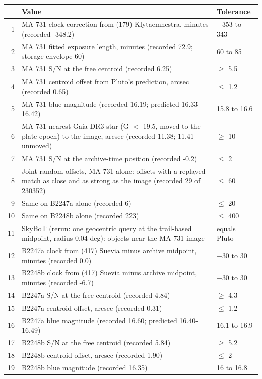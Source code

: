 \documentclass[11pt]{article}
\begin{document}
\begin{appendices}
\begin{table}[p]
\centering
\scriptsize
\begin{tabular}{@{}rp{}l@{}}
\toprule
 & Value & Tolerance \\
\midrule
1 & MA 731 clock correction from (179) Klytaemnestra, minutes (recorded -348.2) & $-$353 to $-$343 \\
2 & MA 731 fitted exposure length, minutes (recorded 72.9; storage envelope 60) & 60 to 85 \\
3 & MA 731 S/N at the free centroid (recorded 6.25) & $\ge$ 5.5 \\
4 & MA 731 centroid offset from Pluto's prediction, arcsec (recorded 0.65) & $\le$ 1.2 \\
5 & MA 731 blue magnitude (recorded 16.19; predicted 16.33-16.42) & 15.8 to 16.6 \\
6 & MA 731 nearest Gaia DR3 star (G $<$ 19.5, moved to the plate epoch) to the image, arcsec (recorded 11.38; 11.41 unmoved) & $\ge$ 10 \\
7 & MA 731 S/N at the archive-time position (recorded -0.2) & $\le$ 2 \\
8 & Joint random offsets, MA 731 alone: offsets with a replayed match as close and as strong as the image (recorded 29 of 230352) & $\le$ 60 \\
9 & Same on B2247a alone (recorded 6) & $\le$ 20 \\
10 & Same on B2248b alone (recorded 223) & $\le$ 400 \\
11 & SkyBoT (rerun: one geocentric query at the trail-based midpoint, radius 0.04 deg): objects near the MA 731 image & equals Pluto \\
12 & B2247a clock from (417) Suevia minus archive midpoint, minutes (recorded 0.0) & $-$30 to 30 \\
13 & B2248b clock from (417) Suevia minus archive midpoint, minutes (recorded -6.7) & $-$30 to 30 \\
14 & B2247a S/N at the free centroid (recorded 4.84) & $\ge$ 4.3 \\
15 & B2247a centroid offset, arcsec (recorded 0.31) & $\le$ 1.2 \\
16 & B2247a blue magnitude (recorded 16.60; predicted 16.40-16.49) & 16.1 to 16.9 \\
17 & B2248b S/N at the free centroid (recorded 5.84) & $\ge$ 5.2 \\
18 & B2248b centroid offset, arcsec (recorded 1.90) & $\le$ 2 \\
19 & B2248b blue magnitude (recorded 16.35) & 16 to 16.8 \\

\end{tabular}
\end{table}
\end{appendices}
\end{document}
